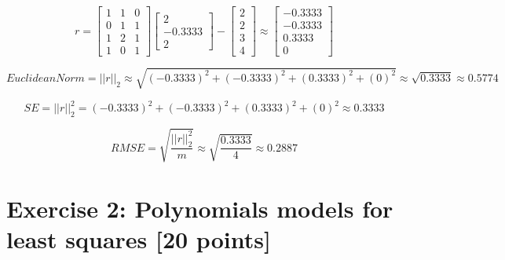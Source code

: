 \documentclass[unicode,11pt,a4paper,oneside,numbers=endperiod,openany]{scrartcl}
\newcommand{\norm}[1]{\lvert\lvert #1 \rvert\rvert}
\begin{document}
\begin{equation*}
 r = \begin{bmatrix}
1 & 1 & 0 \\
0 & 1 & 1 \\
1 & 2 & 1 \\
1 & 0 & 1
\end{bmatrix}
\begin{bmatrix}
        2 \\
        -0.3333 \\
        2
\end{bmatrix} -
\begin{bmatrix}
2 \\
2 \\
3 \\
4
\end{bmatrix} \approx
\begin{bmatrix}
-0.3333 \\
-0.3333 \\
0.3333 \\
0
\end{bmatrix}
\end{equation*}

\begin{equation*}
 EuclideanNorm = \norm{r}_2 \approx \sqrt{(-0.3333)^2 + (-0.3333)^2 + (0.3333)^2 + (0)^2} \approx \sqrt{0.3333} \approx 0.5774
\end{equation*}

\begin{equation*}
 SE = \norm{r}_2^2 = (-0.3333)^2 + (-0.3333)^2 + (0.3333)^2 + (0)^2 \approx 0.3333
\end{equation*}

\begin{equation*}
 RMSE = \sqrt{\frac{\norm{r}_2^2}{m}} \approx \sqrt{\frac{0.3333}{4}} \approx 0.2887
\end{equation*}

\section*{Exercise 2: Polynomials models for least squares [20 points]}
\end{document}
